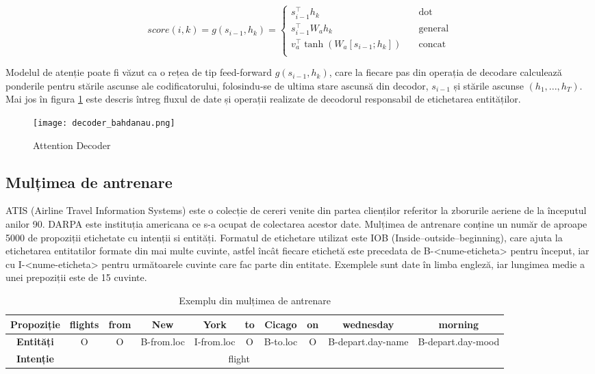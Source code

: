 \[ score(i, k) = g(s_{i-1}, h_k) =
\begin{cases}
s_{i-1}^\top h_k			&	\quad \text{dot}\\
s_{i-1}^\top W_a h_k	&	\quad \text{general}\\
v_a^\top \tanh(W_a [s_{i-1};h_k])	&	\quad \text{concat}\\
\end{cases}
\]

Modelul de atenție poate fi văzut ca o rețea de tip feed-forward $g(s_{i-1}, h_k)$, care la fiecare pas din operația de decodare calculează ponderile pentru stările ascunse ale codificatorului, folosindu-se de ultima stare ascunsă din decodor, $s_{i-1}$ și stările ascunse $(h_1, ..., h_T)$. Mai jos în figura \ref{fig:dec_bah} este descris întreg fluxul de date și operații realizate de decodorul responsabil de etichetarea entităților.

\begin{figure}[h]
	\centering
	\texttt{[image: decoder\_bahdanau.png]}
	\caption{Attention Decoder}
	\label{fig:dec_bah}
\end{figure}

\subsection{Mulțimea de antrenare}
ATIS (Airline Travel Information Systems) \cite{atis} este o colecție de cereri venite din partea clienților referitor la zborurile aeriene de la începutul anilor 90. DARPA este instituția americana ce s-a ocupat de colectarea acestor date. Mulțimea de antrenare conține un număr de aproape 5000 de propoziții etichetate cu intenții si entități. Formatul de etichetare utilizat este IOB (Inside–outside–beginning), care ajuta la etichetarea entitatilor formate din mai multe cuvinte, astfel încât fiecare etichetă este precedata de B-<nume-eticheta> pentru început, iar cu I-<nume-eticheta> pentru următoarele cuvinte care fac parte din entitate. Exemplele sunt date în limba engleză, iar lungimea medie a unei prepoziții este de 15 cuvinte.

\begin{table}
	\centering
	\caption{Exemplu din mulțimea de antrenare}
	\label{atis_example}
	\begin{adjustbox}{max width=\textwidth}
		\begin{tabular}{ |c|c|c|c|c|c|c|c|c|c| } 
			\hline
			\textbf{Propoziție} & flights & from & New & York & to & Cicago & on & wednesday & morning \\ 
			\hline
			\textbf{Entități} & O & O & B-from.loc & I-from.loc & O & B-to.loc & O & B-depart.day-name & B-depart.day-mood \\
			\hline
			\textbf{Intenție} & \multicolumn{8}{c}{flight} &  \\ 
			\hline
		\end{tabular}
	\end{adjustbox}
\end{table}

